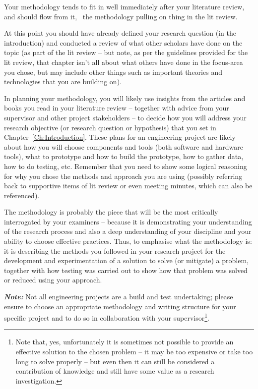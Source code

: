 \label{Ch:Methodology}

Your methodology tends to fit in well immediately after your literature review, and should flow from it, \eg~the methodology pulling on thing in the lit review.

At this point you should have already defined your research question (in the introduction) and conducted a review of what other scholars have done on the topic (as part of the lit review -- but note, as per the guidelines provided for the lit review, that chapter isn't all about what others have done in the focus-area you chose, but may include other things such as important theories and technologies that you are building on).

In planning your methodology, you will likely use insights from the articles and books you read in your literature review -- together with advice from your supervisor and other project stakeholders -- to decide how you will address your research objective (or research question or hypothesis) that you set in Chapter~\ref{Ch:Introduction}. These plans for an engineering project are likely about how you will choose components and tools (both software and hardware tools), what to prototype and how to build the prototype, how to gather data, how to do testing, etc.  Remember that you need to show some logical reasoning for why you chose the methods and approach you are using (possibly referring back to supportive items of lit review or even meeting minutes, which can also be referenced).

The methodology is probably the piece that will be the most critically interrogated by your examiners -- because it is demonstrating your understanding of the research process and also a deep understanding of your discipline and your ability to choose effective practices.  Thus, to emphasise what the methodology is: it is describing the methods you followed in your research project for the development and experimentation of a solution to solve (or mitigate) a problem, together with how testing was carried out to show how that problem was solved or reduced using your approach.

\textbf{\textit{Note:}} Not all engineering projects are a build and test undertaking; please ensure to choose an appropriate methodology and writing structure for your specific project and to do so in collaboration with your supervisor\footnote{Note that, yes, unfortunately it is sometimes not possible to provide an effective solution to the chosen problem -- it may be too expensive or take too long to solve properly -- but even then it can still be considered a contribution of knowledge and still have some value as a research investigation.}.

